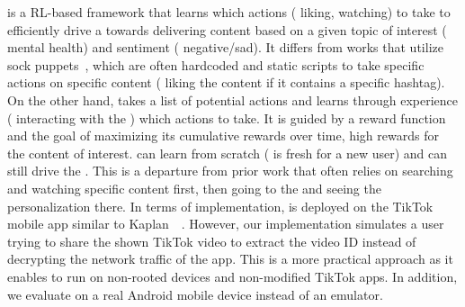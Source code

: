 \autolike{} is a RL-based framework that learns which actions (\eg{} liking, watching) to take to efficiently drive a \rs{} towards delivering content based on a given topic of interest (\eg{} mental health) and sentiment (\eg{} negative/sad). It differs from works that utilize sock puppets~\cite{HaroonYoutubePNA,RibeiroYoutubePathways,BoekerTikTokPersonalization,KaplanTikTok,iqbal-imc-alexa}, which are often hardcoded and static scripts to take specific actions on specific content (\eg{} liking the content if it contains a specific hashtag). On the other hand, \autolike{} takes a list of potential actions and learns through experience (\ie{} interacting with the \fyp{}) which actions to take. It is guided by a reward function and the goal of maximizing its cumulative rewards over time, \eg{} high rewards for the content of interest. 
\autolike{} can learn from scratch (\fyp{} is fresh for a new user) and can still drive the \rs{}. This is a departure from prior work that often relies on searching and watching specific content first, then going to the \fyp{} and seeing the personalization there.
In terms of implementation, \autolike{} is deployed on the TikTok mobile app similar to Kaplan~\etal{}~\cite{KaplanTikTok}. However, our implementation simulates a user trying to share the shown TikTok video to extract the video ID instead of decrypting the network traffic of the app. This is a more practical approach as it enables \autolike{} to run on non-rooted devices and non-modified TikTok apps. In addition, we evaluate \autolike{} on a real Android mobile device instead of an emulator.